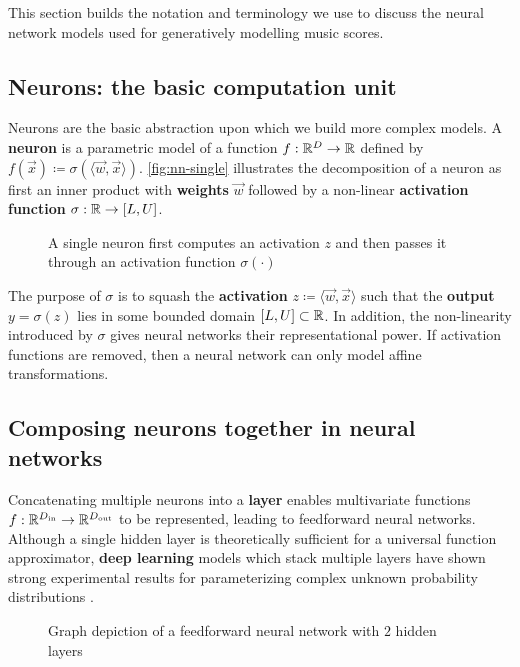 This section builds the notation and terminology we use to discuss the neural network
models used for generatively modelling music scores.

\subsection{Neurons: the basic computation unit}

Neurons are the basic abstraction upon which we build more complex
models. A \textbf{neuron} is a parametric model of a function $f : \mathbb{R}^D \to
\mathbb{R}$ defined by $f(\vec{x}) \coloneqq \sigma( \langle \vec{w}, \vec{x} \rangle
)$. \autoref{fig:nn-single} illustrates the decomposition of a neuron as first
an inner product with \textbf{weights} $\vec{w}$ followed by a non-linear
\textbf{activation function} $\sigma : \mathbb{R} \to [L, U]$.

\begin{figure}[htpb]
    \centering
    
    \caption{A single neuron first computes an activation $z$ and then passes it through
    an activation function $\sigma(\cdot)$}
    \label{fig:nn-single}
\end{figure}

The purpose of $\sigma$ is to squash the \textbf{activation} $z \coloneqq
\langle \vec{w}, \vec{x} \rangle$ such that the \textbf{output} $y = \sigma(z)$
lies in some bounded domain $[L, U] \subset \mathbb{R}$. In addition, the
non-linearity introduced by $\sigma$ gives neural networks their
representational power. If activation functions are removed, then a neural
network can only model affine transformations.

\subsection{Composing neurons together in neural networks}

Concatenating multiple neurons into a \textbf{layer} enables multivariate functions $f :
\mathbb{R}^{D_\text{in}} \to \mathbb{R}^{D_\text{out}}$ to be represented, leading to feedforward
neural networks. Although a single hidden layer is theoretically sufficient for
a universal function approximator\cite{Cybenko1993}, \textbf{deep learning}
models which stack multiple layers have shown strong experimental results
for parameterizing complex unknown probability distributions \cite{Bengio2011}.

\begin{figure}[htpb]
    \centering
    
    \caption{Graph depiction of a feedforward neural network with $2$ hidden layers}
    \label{fig:nn-ffw}
\end{figure}

